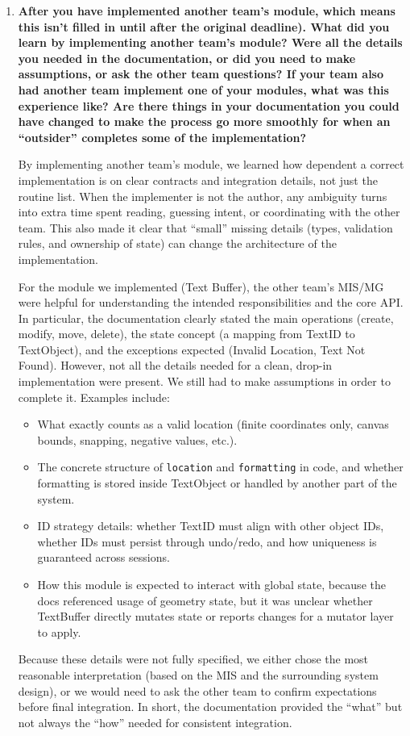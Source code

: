 \documentclass[12pt, titlepage]{article}
\begin{document}
\begin{enumerate}

\item \textbf{After you have implemented another team's module, which means this
isn't filled in until after the original deadline). What did you learn by
implementing another team's module? Were all the details you needed in the
documentation, or did you need to make assumptions, or ask the other team
questions?  If your team also had another team implement one of your modules,
what was this experience like?  Are there things in your documentation you
could have changed to make the process go more smoothly for when an
``outsider'' completes some of the implementation?}

By implementing another team's module, we learned how dependent a correct
implementation is on clear contracts and integration details, not just the
routine list. When the implementer is not the author, any ambiguity turns
into extra time spent reading, guessing intent, or coordinating with the
other team. This also made it clear that ``small'' missing details (types,
validation rules, and ownership of state) can change the architecture of
the implementation.

For the module we implemented (Text Buffer), the other team's MIS/MG were
helpful for understanding the intended responsibilities and the core API.
In particular, the documentation clearly stated the main operations
(create, modify, move, delete), the state concept (a mapping from TextID
to TextObject), and the exceptions expected (Invalid Location, Text Not
Found). However, not all the details needed for a clean, drop-in
implementation were present. We still had to make assumptions in order to
complete it. Examples include:
\begin{itemize}
  \item What exactly counts as a valid location (finite coordinates only,
        canvas bounds, snapping, negative values, etc.).
  \item The concrete structure of \texttt{location} and \texttt{formatting}
        in code, and whether formatting is stored inside TextObject or
        handled by another part of the system.
  \item ID strategy details: whether TextID must align with other object
        IDs, whether IDs must persist through undo/redo, and how uniqueness
        is guaranteed across sessions.
  \item How this module is expected to interact with global state, because
        the docs referenced usage of geometry state, but it was unclear
        whether TextBuffer directly mutates state or reports changes for a
        mutator layer to apply.
\end{itemize}
Because these details were not fully specified, we either chose the most
reasonable interpretation (based on the MIS and the surrounding system
design), or we would need to ask the other team to confirm expectations
before final integration. In short, the documentation provided the ``what''
but not always the ``how'' needed for consistent integration.


\end{enumerate}
\end{document}
